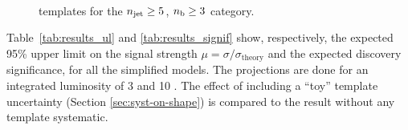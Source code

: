 \begin{figure}
  \begin{center}
     ~~
     \\
    \caption{\mht templates for the $n_{\text{jet}}\geq 5$, $n_{\text{b}}\geq 3$ category.}
    \label{fig:mht_ge3b_ge5j}
  \end{center}
\end{figure}


Table~\ref{tab:results_ul} and \ref{tab:results_signif} show, respectively, 
the expected 95\% upper limit on the signal strength $\mu=\sigma/\sigma_{\mathrm{theory}}$ 
and the expected discovery significance, for all the simplified models. 
The projections are done for an integrated luminosity of 3 \ifb and 10 \ifb. 
The effect of including a ``toy'' template uncertainty (Section \ref{sec:syst-on-shape}) is compared to the result without any template systematic.  


